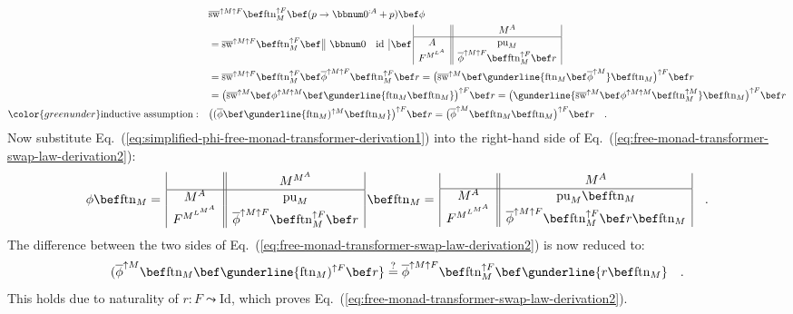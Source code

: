 \begin{align*}
 & \overline{\text{sw}}^{\uparrow M\uparrow F}\bef\text{ftn}_{M}^{\uparrow F}\bef(p\rightarrow\bbnum 0^{:A}+p)\bef\phi\\
 & =\overline{\text{sw}}^{\uparrow M\uparrow F}\bef\text{ftn}_{M}^{\uparrow F}\bef\,\begin{array}{||cc|}
\bbnum 0 & \text{id}\end{array}\,\bef\,\begin{array}{|c||c|}
 & M^{A}\\
\hline A & \text{pu}_{M}\\
F^{M^{L^{A}}} & \overline{\phi}^{\uparrow M\uparrow F}\bef\text{ftn}_{M}^{\uparrow F}\bef r
\end{array}\\
 & =\overline{\text{sw}}^{\uparrow M\uparrow F}\bef\text{ftn}_{M}^{\uparrow F}\bef\overline{\phi}^{\uparrow M\uparrow F}\bef\text{ftn}_{M}^{\uparrow F}\bef r=\big(\overline{\text{sw}}^{\uparrow M}\bef\gunderline{\text{ftn}_{M}\bef\overline{\phi}^{\uparrow M}}\bef\text{ftn}_{M}\big)^{\uparrow F}\bef r\\
 & =\big(\overline{\text{sw}}^{\uparrow M}\bef\phi^{\uparrow M\uparrow M}\bef\gunderline{\text{ftn}_{M}\bef\text{ftn}_{M}}\big)^{\uparrow F}\bef r=\big(\gunderline{\overline{\text{sw}}^{\uparrow M}\bef\phi^{\uparrow M\uparrow M}\bef\text{ftn}_{M}^{\uparrow M}}\bef\text{ftn}_{M}\big)^{\uparrow F}\bef r\\
{\color{greenunder}\text{inductive assumption}:}\quad & \big((\overline{\phi}\bef\gunderline{\text{ftn}_{M})^{\uparrow M}\bef\text{ftn}_{M}}\big)^{\uparrow F}\bef r=\big(\overline{\phi}^{\uparrow M}\bef\text{ftn}_{M}\bef\text{ftn}_{M}\big)^{\uparrow F}\bef r\quad.
\end{align*}
Now substitute Eq.~(\ref{eq:simplified-phi-free-monad-transformer-derivation1})
into the right-hand side of Eq.~(\ref{eq:free-monad-transformer-swap-law-derivation2}):
\[
\phi\bef\text{ftn}_{M}=\,\begin{array}{|c||c|}
 & M^{M^{A}}\\
\hline M^{A} & \text{pu}_{M}\\
F^{M^{L^{M^{A}}}} & \overline{\phi}^{\uparrow M\uparrow F}\bef\text{ftn}_{M}^{\uparrow F}\bef r
\end{array}\,\bef\text{ftn}_{M}=\,\begin{array}{|c||c|}
 & M^{A}\\
\hline M^{A} & \text{pu}_{M}\bef\text{ftn}_{M}\\
F^{M^{L^{M^{A}}}} & \overline{\phi}^{\uparrow M\uparrow F}\bef\text{ftn}_{M}^{\uparrow F}\bef r\bef\text{ftn}_{M}
\end{array}\quad.
\]
The difference between the two sides of Eq.~(\ref{eq:free-monad-transformer-swap-law-derivation2})
is now reduced to:
\[
(\overline{\phi}^{\uparrow M}\bef\text{ftn}_{M}\bef\gunderline{\text{ftn}_{M})^{\uparrow F}\bef r}\overset{?}{=}\overline{\phi}^{\uparrow M\uparrow F}\bef\text{ftn}_{M}^{\uparrow F}\bef\gunderline{r\bef\text{ftn}_{M}}\quad.
\]
This holds due to naturality of $r:F\leadsto\text{Id}$, which proves
Eq.~(\ref{eq:free-monad-transformer-swap-law-derivation2}).

